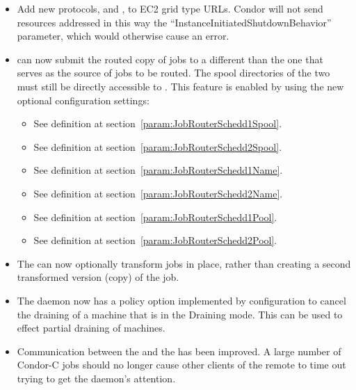 \begin{itemize}

\item Add new
protocols,  and , to EC2 grid type URLs.  
Condor will not send resources addressed in this way the
``InstanceInitiatedShutdownBehavior'' parameter, which would otherwise cause 
an error.

\item {} can now submit the routed copy of jobs to a
different  than the one that serves as the source of
jobs to be routed.  The spool directories of the two
 must still be directly accessible to
.  This feature is enabled by using the new
optional configuration settings:

\begin{itemize}
\item {}
See definition at section~\ref{param:JobRouterSchedd1Spool}.
\item {}
See definition at section~\ref{param:JobRouterSchedd2Spool}.
\item {}
See definition at section~\ref{param:JobRouterSchedd1Name}.
\item {}
See definition at section~\ref{param:JobRouterSchedd2Name}.
\item {}
See definition at section~\ref{param:JobRouterSchedd1Pool}.
\item {}
See definition at section~\ref{param:JobRouterSchedd2Pool}.
\end{itemize}

\item The  can now optionally transform jobs in place,
rather than creating a second transformed version (copy) of the job.

\item The  daemon now has a policy option implemented
by configuration to cancel the draining
of a machine that is in the Draining mode.  This can be used to effect
partial draining of machines.

\item Communication between the  and the  has
been improved. A large number of Condor-C jobs should no longer cause
other clients of the remote  to time out trying to get the
 daemon's attention.


\end{itemize}

